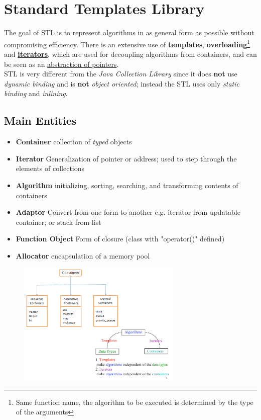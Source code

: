 \chapter{Standard Templates Library}
The goal of STL is to represent algorithms in as general form as possible without compromising efficiency.
There is an extensive use of \textbf{templates}, \textbf{overloading}\footnote{Same function name, the algorithm to be executed is determined by the type of the arguments} and \ul{\textbf{iterators}},
which are used for decoupling algorithms from containers,
and can be seen as an \ul{abstraction of pointers}.\\
STL is very different from the \textit{Java Collection Library} since it does \textbf{not} use \textit{dynamic binding} and is \textbf{not} \textit{object oriented};
instead the STL uses only \textit{static binding} and \textit{inlining}.

\section{Main Entities}
\begin{itemize}
   \item \textbf{Container} collection of \textit{typed} objects
   \item \textbf{Iterator} Generalization of pointer or address;
   used to step through the elements of collections
   \item \textbf{Algorithm} initializing, sorting, searching, and transforming contents of containers
   \item \textbf{Adaptor} Convert from one form to another e.g. iterator from updatable container; or stack from list
   \item \textbf{Function Object} Form of closure (class with "operator()" defined)
   \item \textbf{Allocator} encapsulation of a memory pool
\end{itemize}

\begin{figure}[h]
   \centering
   \includegraphics[width=0.7\textwidth]{images/STL_containers.png}
   \label{fig:STL_containers}
\end{figure}

